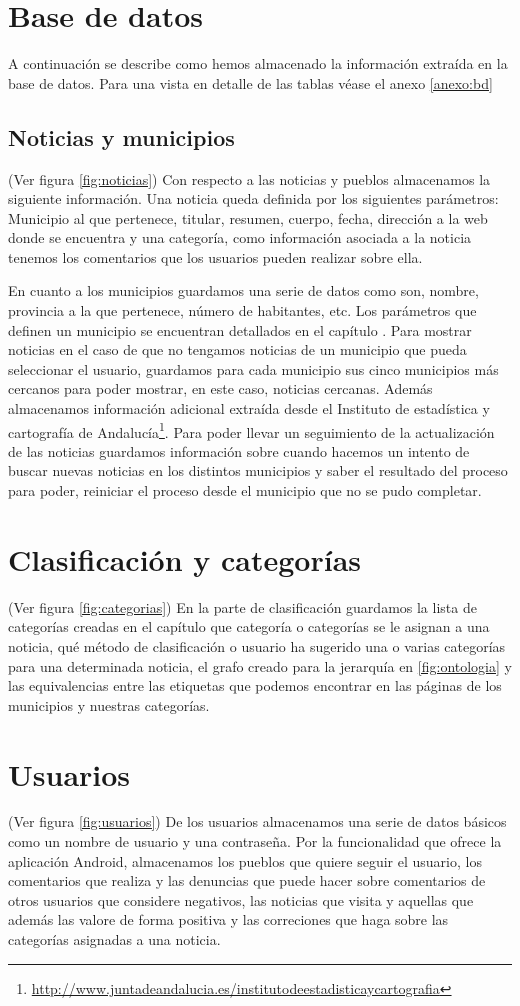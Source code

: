 \section{Base de datos}
A continuación se describe como hemos almacenado la información extraída en la base de datos. Para una vista en detalle de las tablas véase el anexo \ref{anexo:bd}
\subsection{Noticias y municipios}
(Ver figura \ref{fig:noticias}) 
Con respecto a las noticias y pueblos almacenamos la siguiente información. Una noticia queda definida por los siguientes parámetros: Municipio al que pertenece, titular, resumen, cuerpo, fecha, dirección a la web donde se encuentra y una categoría, como información asociada a la noticia tenemos los comentarios que los usuarios pueden realizar sobre ella.

En cuanto a los municipios guardamos una serie de datos como son, nombre, provincia a la que pertenece, número de habitantes, etc. Los parámetros que definen un municipio se encuentran detallados en el capítulo . Para mostrar noticias en el caso de que no tengamos noticias de un municipio que pueda seleccionar el usuario, guardamos para cada municipio sus cinco municipios más cercanos para poder mostrar, en este caso, noticias cercanas. Además almacenamos información adicional extraída desde el Instituto de estadística y cartografía  de Andalucía\footnote{\url{http://www.juntadeandalucia.es/institutodeestadisticaycartografia}}. Para poder llevar un seguimiento de la actualización de las noticias guardamos información sobre cuando hacemos un intento de buscar nuevas noticias en los distintos municipios y saber el resultado del proceso para poder, reiniciar el proceso desde el municipio que no se pudo completar.
\section{Clasificación y categorías}
(Ver figura \ref{fig:categorias})
En la parte de clasificación guardamos la lista de categorías creadas en el capítulo  que categoría o categorías se le asignan a una noticia, qué método de clasificación o usuario ha sugerido una o varias categorías para una determinada noticia, el grafo creado para la jerarquía en \ref{fig:ontologia} y las equivalencias entre las etiquetas que podemos encontrar en las páginas de los municipios y nuestras categorías.
\section{Usuarios}
(Ver figura \ref{fig:usuarios})
De los usuarios almacenamos una serie de datos básicos como un nombre de usuario y una contraseña. Por la funcionalidad que ofrece la aplicación Android, almacenamos los pueblos que quiere seguir el usuario, los comentarios que realiza y las denuncias que puede hacer sobre comentarios de otros usuarios que considere negativos, las noticias que visita y aquellas que además las valore de forma positiva y las correciones que haga sobre las categorías asignadas a una noticia.


